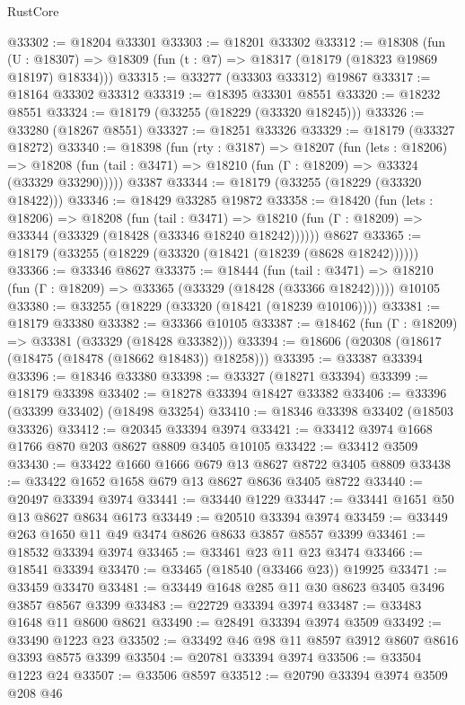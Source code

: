 \begin{lexlean}{RustCore}
\begin{coremodule}
@33302 := @18204 @33301
@33303 := @18201 @33302
@33312 := @18308
    (fun (U : @18307) => @18309 (fun (t : @7) => @18317 (@18179 (@18323 @19869 @18197) @18334)))
@33315 := @33277 (@33303 @33312) @19867
@33317 := @18164 @33302 @33312
@33319 := @18395 @33301 @8551
@33320 := @18232 @8551
@33324 := @18179 (@33255 (@18229 (@33320 @18245)))
@33326 := @33280 (@18267 @8551)
@33327 := @18251 @33326
@33329 := @18179 (@33327 @18272)
@33340 := @18398
    (fun (rty : @3187) =>
    @18207
      (fun (lets : @18206) =>
      @18208 (fun (tail : @3471) => @18210 (fun (Γ : @18209) => @33324 (@33329 @33290)))))
    @3387
@33344 := @18179 (@33255 (@18229 (@33320 @18422)))
@33346 := @18429 @33285 @19872
@33358 := @18420
    (fun (lets : @18206) =>
    @18208
      (fun (tail : @3471) =>
      @18210 (fun (Γ : @18209) => @33344 (@33329 (@18428 (@33346 @18240 @18242))))))
    @8627
@33365 := @18179 (@33255 (@18229 (@33320 (@18421 (@18239 (@8628 @18242))))))
@33366 := @33346 @8627
@33375 := @18444
    (fun (tail : @3471) => @18210 (fun (Γ : @18209) => @33365 (@33329 (@18428 (@33366 @18242)))))
    @10105
@33380 := @33255 (@18229 (@33320 (@18421 (@18239 @10106))))
@33381 := @18179 @33380
@33382 := @33366 @10105
@33387 := @18462 (fun (Γ : @18209) => @33381 (@33329 (@18428 @33382)))
@33394 := @18606 (@20308 (@18617 (@18475 (@18478 (@18662 @18483)) @18258)))
@33395 := @33387 @33394
@33396 := @18346 @33380
@33398 := @33327 (@18271 @33394)
@33399 := @18179 @33398
@33402 := @18278 @33394 @18427 @33382
@33406 := @33396 (@33399 @33402) (@18498 @33254)
@33410 := @18346 @33398 @33402 (@18503 @33326)
@33412 := @20345 @33394 @3974
@33421 := @33412 @3974 @1668 @1766 @870 @203 @8627 @8809 @3405 @10105
@33422 := @33412 @3509
@33430 := @33422 @1660 @1666 @679 @13 @8627 @8722 @3405 @8809
@33438 := @33422 @1652 @1658 @679 @13 @8627 @8636 @3405 @8722
@33440 := @20497 @33394 @3974
@33441 := @33440 @1229
@33447 := @33441 @1651 @50 @13 @8627 @8634 @6173
@33449 := @20510 @33394 @3974
@33459 := @33449 @263 @1650 @11 @49 @3474 @8626 @8633 @3857 @8557 @3399
@33461 := @18532 @33394 @3974
@33465 := @33461 @23 @11 @23 @3474
@33466 := @18541 @33394
@33470 := @33465 (@18540 (@33466 @23)) @19925
@33471 := @33459 @33470
@33481 := @33449 @1648 @285 @11 @30 @8623 @3405 @3496 @3857 @8567 @3399
@33483 := @22729 @33394 @3974
@33487 := @33483 @1648 @11 @8600 @8621
@33490 := @28491 @33394 @3974 @3509
@33492 := @33490 @1223 @23
@33502 := @33492 @46 @98 @11 @8597 @3912 @8607 @8616 @3393 @8575 @3399
@33504 := @20781 @33394 @3974
@33506 := @33504 @1223 @24
@33507 := @33506 @8597
@33512 := @20790 @33394 @3974 @3509 @208 @46

\end{coremodule}
\end{lexlean}

